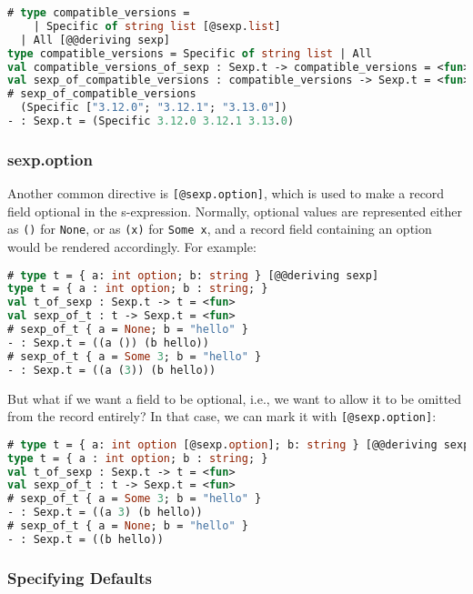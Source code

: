 \begin{lstlisting}[language=Caml]
# type compatible_versions =
    | Specific of string list [@sexp.list]
  | All [@@deriving sexp]
type compatible_versions = Specific of string list | All
val compatible_versions_of_sexp : Sexp.t -> compatible_versions = <fun>
val sexp_of_compatible_versions : compatible_versions -> Sexp.t = <fun>
# sexp_of_compatible_versions
  (Specific ["3.12.0"; "3.12.1"; "3.13.0"])
- : Sexp.t = (Specific 3.12.0 3.12.1 3.13.0)
\end{lstlisting}

\hypertarget{sexp_option}{%
\subsubsection{sexp.option}\label{sexp_option}}

Another common directive is \passthrough{\lstinline![@sexp.option]!},
which is used to make a record field optional in the s-expression.
Normally, optional values are represented either as
\passthrough{\lstinline!()!} for \passthrough{\lstinline!None!}, or as
\passthrough{\lstinline!(x)!} for \passthrough{\lstinline!Some x!}, and
a record field containing an option would be rendered accordingly. For
example: 

\begin{lstlisting}[language=Caml]
# type t = { a: int option; b: string } [@@deriving sexp]
type t = { a : int option; b : string; }
val t_of_sexp : Sexp.t -> t = <fun>
val sexp_of_t : t -> Sexp.t = <fun>
# sexp_of_t { a = None; b = "hello" }
- : Sexp.t = ((a ()) (b hello))
# sexp_of_t { a = Some 3; b = "hello" }
- : Sexp.t = ((a (3)) (b hello))
\end{lstlisting}

But what if we want a field to be optional, i.e., we want to allow it to
be omitted from the record entirely? In that case, we can mark it with
\passthrough{\lstinline![@sexp.option]!}:

\begin{lstlisting}[language=Caml]
# type t = { a: int option [@sexp.option]; b: string } [@@deriving sexp]
type t = { a : int option; b : string; }
val t_of_sexp : Sexp.t -> t = <fun>
val sexp_of_t : t -> Sexp.t = <fun>
# sexp_of_t { a = Some 3; b = "hello" }
- : Sexp.t = ((a 3) (b hello))
# sexp_of_t { a = None; b = "hello" }
- : Sexp.t = ((b hello))
\end{lstlisting}

\hypertarget{specifying-defaults}{%
\subsubsection{Specifying Defaults}\label{specifying-defaults}}

